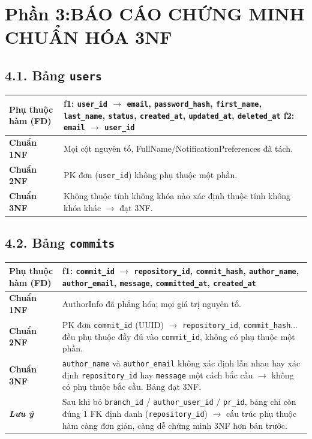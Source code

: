 \section*{ Phần 3:BÁO CÁO CHỨNG MINH CHUẨN HÓA 3NF }
\subsection*{4.1. Bảng \texttt{users}}

\noindent
\begin{tabularx}{\textwidth}{@{} >{\bfseries}p{3.5cm} X @{}}
\hline
Phụ thuộc hàm (FD) & 
\textbf{f1:} \texttt{user\_id} $\rightarrow$ \texttt{email}, \texttt{password\_hash}, \texttt{first\_name}, \texttt{last\_name}, \texttt{status}, \texttt{created\_at}, \texttt{updated\_at}, \texttt{deleted\_at} \newline
\textbf{f2:} \texttt{email} $\rightarrow$ \texttt{user\_id} \\
\hline
Chuẩn 1NF & Mọi cột nguyên tố, FullName/NotificationPreferences đã tách. \\
\hline
Chuẩn 2NF & PK đơn (\texttt{user\_id}) không phụ thuộc một phần. \\
\hline
Chuẩn 3NF & Không thuộc tính không khóa nào xác định thuộc tính không khóa khác $\rightarrow$ đạt 3NF. \\
\hline
\end{tabularx}

\vspace{0.5cm}

\subsection*{4.2. Bảng \texttt{commits} }

\noindent
\begin{tabularx}{\textwidth}{@{} >{\bfseries}p{3.5cm} X @{}}
\hline
Phụ thuộc hàm (FD) & 
\textbf{f1:} \texttt{commit\_id} $\rightarrow$ \texttt{repository\_id}, \texttt{commit\_hash}, \texttt{author\_name}, \texttt{author\_email}, \texttt{message}, \texttt{committed\_at}, \texttt{created\_at} \\
\hline
Chuẩn 1NF & AuthorInfo đã phẳng hóa; mọi giá trị nguyên tố. \\
\hline
Chuẩn 2NF & PK đơn \texttt{commit\_id} (UUID) $\rightarrow$ \texttt{repository\_id}, \texttt{commit\_hash}... đều phụ thuộc đầy đủ vào \texttt{commit\_id}, không có phụ thuộc một phần. \\
\hline
Chuẩn 3NF & \texttt{author\_name} và \texttt{author\_email} không xác định lẫn nhau hay xác định \texttt{repository\_id} hay \texttt{message} một cách bắc cầu $\rightarrow$ không có phụ thuộc bắc cầu. Bảng đạt 3NF. \\
\hline
\textit{Lưu ý} & Sau khi bỏ \texttt{branch\_id} / \texttt{author\_user\_id} / \texttt{pr\_id}, bảng chỉ còn đúng 1 FK định danh (\texttt{repository\_id}) $\rightarrow$ cấu trúc phụ thuộc hàm càng đơn giản, càng dễ chứng minh 3NF hơn bản trước. \\
\hline
\end{tabularx}

